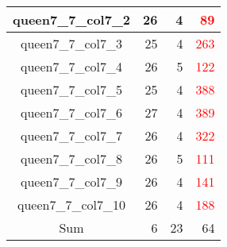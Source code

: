 \begin{longtable}{|c|r|r|r|}
  queen7\_7\_col7\_2 & 26 & 4 & \textcolor{red}{89} \\ \hline
  queen7\_7\_col7\_3 & 25 & 4 & \textcolor{red}{263} \\ \hline
  queen7\_7\_col7\_4 & 26 & 5 & \textcolor{red}{122} \\ \hline
  queen7\_7\_col7\_5 & 25 & 4 & \textcolor{red}{388} \\ \hline
  queen7\_7\_col7\_6 & 27 & 4 & \textcolor{red}{389} \\ \hline
  queen7\_7\_col7\_7 & 26 & 4 & \textcolor{red}{322} \\ \hline
  queen7\_7\_col7\_8 & 26 & 5 & \textcolor{red}{111} \\ \hline
  queen7\_7\_col7\_9 & 26 & 4 & \textcolor{red}{141} \\ \hline
  queen7\_7\_col7\_10 & 26 & 4 & \textcolor{red}{188} \\ \hline \hline
  Sum & 6 & 23 & 64 \\ \hline
\end{longtable}